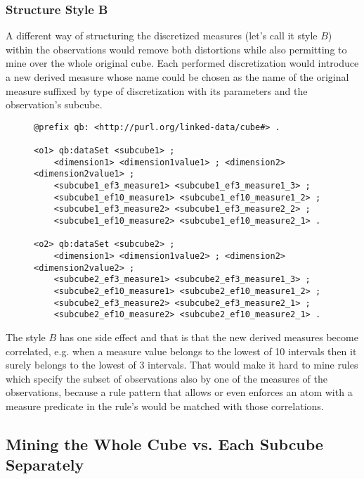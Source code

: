 \subsubsection{Structure Style B}

A different way of structuring the discretized measures (let's call it style $B$) within the observations would remove both distortions while also permitting to mine over the whole original cube. Each performed discretization would introduce a new derived measure whose name could be chosen as the name of the original measure suffixed by type of discretization with its parameters and the observation's subcube.

\begin{figure}[h]
\begin{lstlisting}[language = turtle, caption={Discretization style B}, label={discsample},captionpos=b escapeinside={(*@}{@*)}]
@prefix qb: <http://purl.org/linked-data/cube#> .
                
<o1> qb:dataSet <subcube1> ;
    <dimension1> <dimension1value1> ; <dimension2> <dimension2value1> ;
    <subcube1_ef3_measure1> <subcube1_ef3_measure1_3> ;
    <subcube1_ef10_measure1> <subcube1_ef10_measure1_2> ;
    <subcube1_ef3_measure2> <subcube1_ef3_measure2_2> ; 
    <subcube1_ef10_measure2> <subcube1_ef10_measure2_1> .
       
<o2> qb:dataSet <subcube2> ;
    <dimension1> <dimension1value2> ; <dimension2> <dimension2value2> ;
    <subcube2_ef3_measure1> <subcube2_ef3_measure1_3> ;
    <subcube2_ef10_measure1> <subcube2_ef10_measure1_2> ;
    <subcube2_ef3_measure2> <subcube2_ef3_measure2_1> ;
    <subcube2_ef10_measure2> <subcube2_ef10_measure2_1> .
\end{lstlisting}
\end{figure}

The style $B$ has one side effect and that is that the new derived measures become correlated, e.g. when a measure value belongs to the lowest of 10 intervals then it surely belongs to the lowest of 3 intervals. That would make it hard to mine rules which specify the subset of observations also by one of the measures of the observations, because a rule pattern that allows or even enforces an atom with a measure predicate in the rule's would be matched with those correlations.

\subsection{Mining the Whole Cube vs. Each Subcube Separately\label{wholevssep}}

